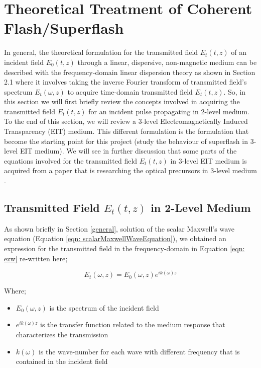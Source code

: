 \section{Theoretical Treatment of Coherent Flash/Superflash}
In general, the theoretical formulation for the transmitted field $E_{t}(t, z)$ of an incident field $E_{0}(t, z)$ through a linear, dispersive, non-magnetic medium can be described with the frequency-domain linear dispersion theory as shown in Section 2.1 where it involves taking the inverse Fourier transform of transmitted field's spectrum $E_{t}(\omega, z)$ to acquire time-domain transmitted field $E_{t}(t, z)$. So, in this section we will first briefly review the concepts involved in acquiring the transmitted field $E_{t}(t, z)$ for an incident pulse propagating in 2-level medium. To the end of this section, we will review a 3-level Electromagnetically Induced Transparency (EIT) medium. This different formulation is the formulation that become the starting point for this project (study the behaviour of superflash in 3-level EIT medium). We will see in further discussion that some parts of the equations involved for the transmitted field $E_{t}(t, z)$ in 3-level EIT medium is acquired from a paper that is researching the optical precursors in 3-level medium \cite{jeong2010slow}.

\subsection{Transmitted Field $E_{t}(t, z)$ in 2-Level Medium}
As shown briefly in Section \ref{general}, solution of the scalar Maxwell's wave equation (Equation \ref{eqn: scalarMaxwellWaveEquation}), we obtained an expression for the transmitted field in the frequency-domain in Equation \ref{eqn: ezw} re-written here;

\begin{equation}
    E_{t}(\omega, z) = E_{0}(\omega, z) e^{ik(\omega)z}
    \label{eqn: transmittedFieldSpectrum}
\end{equation}

Where;

\begin{itemize}
    \item $E_{0}(\omega, z)$ is the spectrum of the incident field
    \item $e^{ik(\omega)z}$ is the transfer function related to the medium response that characterizes the transmission
    \item $k(\omega)$ is the wave-number for each wave with different frequency that is contained in the incident field
\end{itemize}

